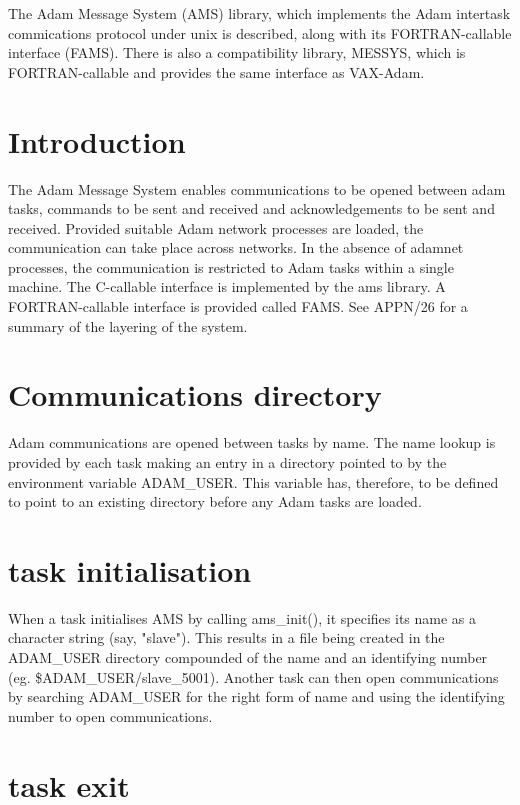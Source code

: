 The Adam Message System (AMS) library, which implements the Adam
intertask commications protocol under unix is described, along with its
FORTRAN-callable interface (FAMS). There is also a compatibility library,
MESSYS, which is FORTRAN-callable and provides the same interface as
VAX-Adam.



\section {Introduction}

The Adam Message System enables communications to be opened between adam
tasks, commands to be sent and received and acknowledgements to be sent
and received. Provided suitable Adam network processes are loaded, the
communication can take place across networks. In the absence of adamnet
processes, the communication is restricted to Adam tasks within a single
machine. The C-callable interface is implemented by the ams library. A
FORTRAN-callable interface is provided called FAMS. See APPN/26 for a
summary of the layering of the system.


\section {Communications directory}

Adam communications are opened between tasks by name. The name lookup is
provided by each task making an entry in a directory pointed to by the
environment variable ADAM\_USER. This variable has, therefore, to be
defined to point to an existing directory before any Adam tasks are loaded.

\section {task initialisation}

When a task initialises AMS by calling ams\_init(), it specifies its name
as a character string (say, "slave"). This results in a file being
created in the ADAM\_USER directory compounded of the name and an
identifying number (eg. \$ADAM\_USER/slave\_5001). Another task can then
open communications by searching ADAM\_USER for the right form of name and
using the identifying number to open communications.


\section {task exit}

